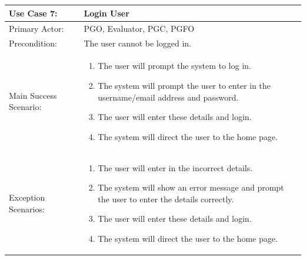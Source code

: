 \documentclass{article}
\begin{document}
\\ \\ \\ \\
\begin{tabular} {| m{5cm} | m{10cm} |}
\hline
Use Case 7: & Login User \\
\hline
Primary Actor: & PGO, Evaluator, PGC, PGFO \\
\hline
Precondition: & The user cannot be logged in.  \\
\hline
Main Success Scenario: & \begin{enumerate} \itemsep0em \item The user will prompt the system to log in.
\item The system will prompt the user to enter in the username/email address and password.
\item The user will enter these details and login.
\item The system will direct the user to the home page.
\end{enumerate}\\
\hline
Exception Scenarios: & \begin{enumerate} \itemsep0em \item The user will enter in the incorrect details.
\item The system will show an error message and prompt the user to enter the details correctly.
\item The user will enter these details and login.
\item The system will direct the user to the home page.
\end{enumerate}\\
\hline
\end{tabular}
\\ \\ \\ \\
\end{document}
